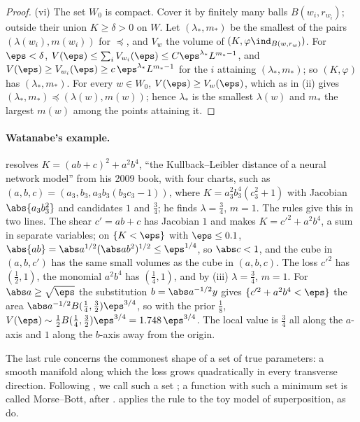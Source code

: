 \begin{refsection}
\begin{proof}
(vi) The set $W_0$ is compact. Cover it by finitely many balls $B(w_i,r_{w_i})$; outside their union $K\ge\delta>0$ on $W$. Let $(\lambda_*,m_*)$ be the smallest of the pairs $(\lambda(w_i),m(w_i))$ for $\preceq$, and $V_w$ the volume of $(K,\varphi\ind_{B(w,r_w)})$. For $\eps<\delta$, $V(\eps)\le\sum_iV_{w_i}(\eps)\le C\eps^{\lambda_*}L^{m_*-1}$, and $V(\eps)\ge V_{w_i}(\eps)\ge c\,\eps^{\lambda_*}L^{m_*-1}$ for the $i$ attaining $(\lambda_*,m_*)$; so $(K,\varphi)$ has $(\lambda_*,m_*)$. For every $w\in W_0$, $V(\eps)\ge V_w(\eps)$, which as in (ii) gives $(\lambda_*,m_*)\preceq(\lambda(w),m(w))$; hence $\lambda_*$ is the smallest $\lambda(w)$ and $m_*$ the largest $m(w)$ among the points attaining it.
\end{proof}

\paragraph{Watanabe's example.} \Textcite{Watanabe2013} resolves $K=(ab+c)^2+a^2b^4$, ``the Kullback--Leibler distance of a neural network model'' from his 2009 book, with four charts, such as $(a,b,c)=(a_3,b_3,a_3b_3(b_3c_3-1))$, where $K=a_3^2b_3^4(c_3^2+1)$ with Jacobian $\abs{a_3b_3^2}$ and candidates $1$ and $\frac34$; he finds $\lambda=\frac34$, $m=1$. The rules give this in two lines. The shear $c'=ab+c$ has Jacobian $1$ and makes $K=c'^2+a^2b^4$, a sum in separate variables; on $\{K<\eps\}$ with $\eps\le0.1$, $\abs{ab}=\abs a^{1/2}(\abs ab^2)^{1/2}\le\eps^{1/4}$, so $\abs c<1$, and the cube in $(a,b,c')$ has the same small volumes as the cube in $(a,b,c)$. The loss $c'^2$ has $(\frac12,1)$, the monomial $a^2b^4$ has $(\frac14,1)$, and by (iii) $\lambda=\frac34$, $m=1$. For $\abs a\ge\sqrt\eps$ the substitution $b=\abs a^{-1/2}y$ gives $\{c'^2+a^2b^4<\eps\}$ the area $\abs a^{-1/2}B(\frac14,\frac32)\eps^{3/4}$, so with the prior $\frac18$, $V(\eps)\sim\frac12B(\frac14,\frac32)\eps^{3/4}=1.748\,\eps^{3/4}$. The local value is $\frac34$ all along the $a$-axis and $1$ along the $b$-axis away from the origin.

The last rule concerns the commonest shape of a set of true parameters: a smooth manifold along which the loss grows quadratically in every transverse direction. Following \textcite{WeiEtAl2023}, we call such a set ; a function with such a minimum set is called Morse--Bott, after \textcite{Bott1954}.  applies the rule to the toy model of superposition, as \textcite{ChenEtAl2023} do.


\end{refsection}

